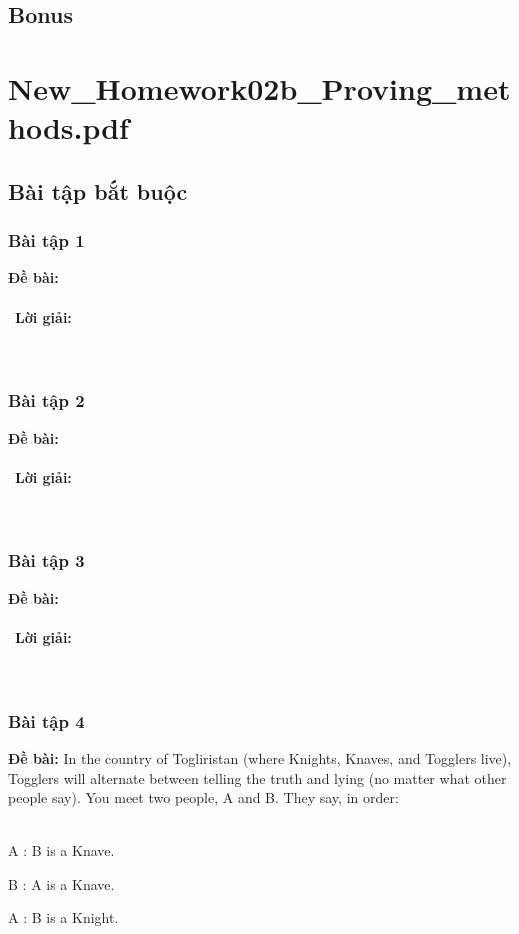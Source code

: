 \documentclass[a4paper]{article}
\begin{document}
\subsection{Bonus}
\clearpage

\section{New\_Homework02b\_Proving\_methods.pdf}
\subsection{Bài tập bắt buộc}
\subsubsection{Bài tập 1}
\textbf{Đề bài:} 
\\\ \\\
\textbf{Lời giải:} \\\ \\\
\clearpage
\subsubsection{Bài tập 2}
\textbf{Đề bài:} 
\\\ \\\
\textbf{Lời giải:} \\\ \\\
\clearpage
\subsubsection{Bài tập 3}
\textbf{Đề bài:} 
\\\ \\\
\textbf{Lời giải:} \\\ \\\
\clearpage
\subsubsection{Bài tập 4}
\textbf{Đề bài:} In the country of Togliristan (where Knights, Knaves, and Togglers live), Togglers will alternate between telling the truth and lying (no matter what other people say). You meet two people, A and B. They say, in order: \\\

A : B is a Knave. 

B : A is a Knave.

A : B is a Knight.
\end{document}
